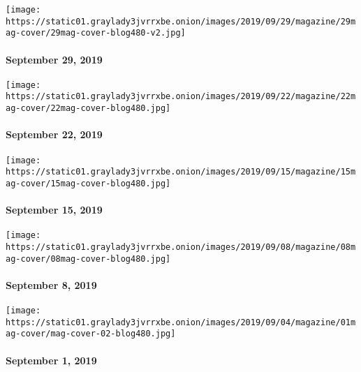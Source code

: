 \texttt{[image: https://static01.graylady3jvrrxbe.onion/images/2019/09/29/magazine/29mag-cover/29mag-cover-blog480-v2.jpg]}

\hypertarget{september-29-2019}{%
\paragraph{September 29, 2019}\label{september-29-2019}}

\href{https://www.nytimes3xbfgragh.onion/issue/magazine/2019/09/20/the-92219-issue}{}

\texttt{[image: https://static01.graylady3jvrrxbe.onion/images/2019/09/22/magazine/22mag-cover/22mag-cover-blog480.jpg]}

\hypertarget{september-22-2019}{%
\paragraph{September 22, 2019}\label{september-22-2019}}

\href{https://www.nytimes3xbfgragh.onion/issue/magazine/2019/09/13/the-91519-issue}{}

\texttt{[image: https://static01.graylady3jvrrxbe.onion/images/2019/09/15/magazine/15mag-cover/15mag-cover-blog480.jpg]}

\hypertarget{september-15-2019}{%
\paragraph{September 15, 2019}\label{september-15-2019}}

\href{https://www.nytimes3xbfgragh.onion/issue/magazine/2019/09/05/the-9819-issue}{}

\texttt{[image: https://static01.graylady3jvrrxbe.onion/images/2019/09/08/magazine/08mag-cover/08mag-cover-blog480.jpg]}

\hypertarget{september-8-2019}{%
\paragraph{September 8, 2019}\label{september-8-2019}}

\href{https://www.nytimes3xbfgragh.onion/issue/magazine/2019/09/04/the-90119-issue}{}

\texttt{[image: https://static01.graylady3jvrrxbe.onion/images/2019/09/04/magazine/01mag-cover/mag-cover-02-blog480.jpg]}

\hypertarget{september-1-2019}{%
\paragraph{September 1, 2019}\label{september-1-2019}}

